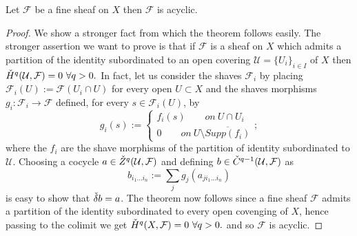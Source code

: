 \documentclass[10pt,a4paper]{amsart}
\begin{document}
\begin{Theorem}
    Let $\mathcal{F}$ be a fine sheaf on $X$ then $\mathcal{F} $ is acyclic.
\end{Theorem}

\begin{proof}
    We show a stronger fact from which the theorem follows easily. The stronger assertion we want to prove is that if $\mathcal{F}$ is a sheaf on $X$ which admits a partition of the identity subordinated to an open covering $\mathcal{U}=\{U_i\}_{i \in I}$ of $X$ then $\Check{H}^q(\mathcal{U},\mathcal{F})=0 \ \forall q>0.$ In fact, let us consider the shaves $\mathcal{F}_i$ by placing $\mathcal{F}_i(U):=\mathcal{F}(U_i \cap U)$ for every open $U \subset X$ and the shaves morphisms $g_i: \mathcal{F}_i \rightarrow \mathcal{F}$ defined, for every $s \in \mathcal{F}_i(U)$, by 
    \begin{equation}
        g_i(s):=
        \begin{cases}
             f_i(s) \qquad on \ U \cap U_i\\
             0  \qquad on \ U\setminus \overline{Supp(f_i)}
        \end{cases};
    \end{equation}
where the $f_i$ are the shave morphisms of the partition of identity subordinated to $\mathcal{U}$. Choosing a cocycle $a \in \Check{Z}^q(\mathcal{U},\mathcal{F})$ and defining $b \in \Check{C}^{q-1}(\mathcal{U},\mathcal{F})$ as 
\begin{equation}
    b_{i_1...i_n}:=\sum_jg_j(a_{ji_1...i_n})
\end{equation}
is easy to show that $\Check{\delta}b=a$. The theorem now follows since a fine sheaf $\mathcal{F}$ admits a partition of the identity subordinated to every open covenging of $X$, hence passing to the colimit we get $\Check{H}^q(X,\mathcal{F})=0 \ \forall q>0.$ and so $\mathcal{F}$ is acyclic. 
\end{proof}
\end{document}
